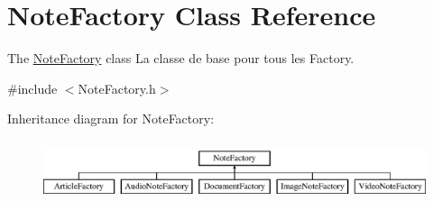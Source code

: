 \hypertarget{class_note_factory}{\section{Note\-Factory Class Reference}
\label{class_note_factory}
}


The \hyperlink{class_note_factory}{Note\-Factory} class La classe de base pour tous les Factory.  




{\ttfamily \#include $<$Note\-Factory.\-h$>$}

Inheritance diagram for Note\-Factory\-:\begin{figure}[H]
\begin{center}
\leavevmode
\includegraphics[height=1.821138cm]{class_note_factory}
\end{center}
\end{figure}
